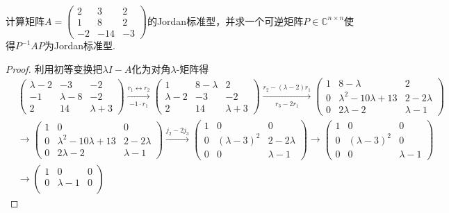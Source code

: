 \documentclass[../../main.tex]{subfiles}%
\begin{document}
\begin{example}
计算矩阵$A=\begin{pmatrix}2 & 3 & 2 \\ 1 & 8 & 2 \\ -2 & -14 & -3\end{pmatrix}$的Jordan标准型，并求一个可逆矩阵$P\in\mathbb{C}^{n\times n}$使得$P^{-1}AP$为Jordan标准型. 
\end{example}
\begin{proof}
利用初等变换把$\lambda I - A$化为对角$\lambda$-矩阵得
\begin{align*}
&\begin{pmatrix}
\lambda - 2 & -3 & -2 \\
-1 & \lambda - 8 & -2 \\
2 & 14 & \lambda + 3
\end{pmatrix}
\xrightarrow[-1 \cdot r_1]{r_1 \longleftrightarrow r_2}
\begin{pmatrix}
1 & 8 - \lambda & 2 \\
\lambda - 2 & -3 & -2 \\
2 & 14 & \lambda + 3
\end{pmatrix}
\xrightarrow[r_3 - 2r_1]{r_2 - (\lambda - 2)r_1}
\begin{pmatrix}
1 & 8 - \lambda & 2 \\
0 & \lambda^2 - 10\lambda + 13 & 2 - 2\lambda \\
0 & 2\lambda - 2 & \lambda - 1
\end{pmatrix} \\
&\longrightarrow
\begin{pmatrix}
1 & 0 & 0 \\
0 & \lambda^2 - 10\lambda + 13 & 2 - 2\lambda \\
0 & 2\lambda - 2 & \lambda - 1
\end{pmatrix}
\xrightarrow[]{j_2 - 2j_3}
\begin{pmatrix}
1 & 0 & 0 \\
0 & (\lambda - 3)^2 & 2 - 2\lambda \\
0 & 0 & \lambda - 1
\end{pmatrix}
\longrightarrow
\begin{pmatrix}
1 & 0 & 0 \\
0 & (\lambda - 3)^2 & 0 \\
0 & 0 & \lambda - 1
\end{pmatrix} \\
&\longrightarrow
\begin{pmatrix}
1 & 0 & 0 \\
0 & \lambda - 1 & 0 \\

\end{pmatrix}
\end{align*}
\end{proof}
\end{document}
